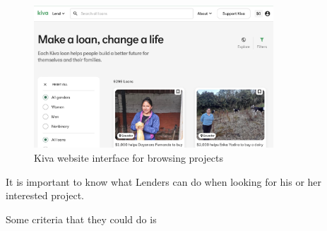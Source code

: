 \begin{figure}[H]
	\centering
	\includegraphics[width=0.8\textwidth]{images/kiva-browse-project.png}
	\caption{Kiva website interface for browsing projects}
	\label{fig:kiva-browser-project}
\end{figure}

It is important to know what Lenders can do when looking for his or her interested project.

Some criteria that they could do is

